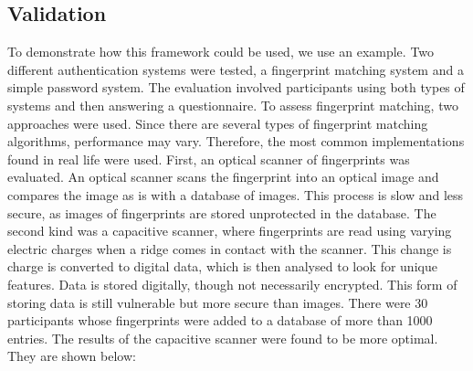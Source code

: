 \subsection{Validation}
To demonstrate how this framework could be used, we use an example. Two different authentication systems were tested, a fingerprint matching system and a simple password system. The evaluation involved participants using both types of systems and then answering a questionnaire. To assess fingerprint matching, two approaches were used. Since there are several types of fingerprint matching algorithms, performance may vary. Therefore, the most common implementations found in real life were used. First, an optical scanner of fingerprints was evaluated. An optical scanner scans the fingerprint into an optical image and compares the image as is with a database of images. This process is slow and less secure, as images of fingerprints are stored unprotected in the database. The second kind was a capacitive scanner, where fingerprints are read using varying electric charges when a ridge comes in contact with the scanner. This change is charge is converted to digital data, which is then analysed to look for unique features. Data is stored digitally, though not necessarily encrypted. This form of storing data is still vulnerable but more secure than images. There were 30 participants whose fingerprints were added to a database of more than 1000 entries. The results of the capacitive scanner were found to be more optimal. They are shown below:

\begin{center}
\begin{table}[H]
\caption{Results for Biometric systems.}
\label{tab:result1}
\end{table}
\end{center}

